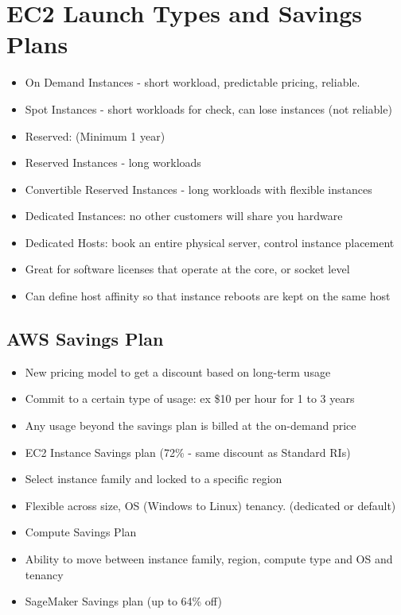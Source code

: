 \section{EC2 Launch Types and Savings Plans}
\begin{itemize}
    \item On Demand Instances - short workload, predictable pricing, reliable.
    \item Spot Instances - short workloads for check, can lose instances (not reliable)
    \item Reserved: (Minimum 1 year)
    \item Reserved Instances - long workloads
    \item Convertible Reserved Instances - long workloads with flexible instances
    \item Dedicated Instances: no other customers will share you hardware
    \item Dedicated Hosts: book an entire physical server, control instance placement
    \item Great for software licenses that operate at the core, or socket level
    \item Can define host affinity so that instance reboots are kept on the same host
\end{itemize}

\subsection{AWS Savings Plan}
\begin{itemize}
    \item New pricing model to get a discount based on long-term usage
    \item Commit to a certain type of usage: ex \$10 per hour for 1 to 3 years
    \item Any usage beyond the savings plan is billed at the on-demand price
\end{itemize}

\begin{itemize}
    \item EC2 Instance Savings plan (72\% - same discount as Standard RIs)
    \item Select instance family and locked to a specific region
    \item Flexible across size, OS (Windows to Linux) tenancy. (dedicated or default)
    \item Compute Savings Plan
    \item Ability to move between instance family, region, compute type and OS and tenancy
    \item SageMaker Savings plan (up to 64\% off)
\end{itemize}


